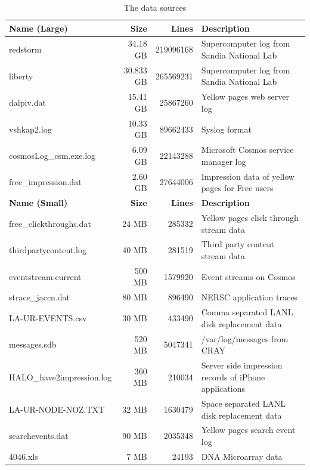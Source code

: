 \begin{table}[t]
\centering
\caption{The data sources}\label{tab:sources}
\begin{tabular}{|l|r|r|l|} \hline
{\bf Name (Large)} & {\bf Size} & {\bf Lines} & {\bf Description} \\ \hline
redstorm & 34.18 GB & 219096168 & Supercomputer log from Sandia National Lab	\\ \hline
liberty & 30.833 GB & 265569231 &	Supercomputer log from Sandia National Lab\\ \hline
dalpiv.dat & 15.41 GB & 25867260 &	Yellow pages web server log \\ \hline
vshkap2.log & 10.33 GB & 89662433	& Syslog format \\ \hline
cosmosLog\_csm.exe.log & 6.09 GB & 22143288 & Microsoft Cosmos service manager log\\ \hline
free\_impression.dat & 2.60 GB & 27644006 & Impression data of yellow pages for Free users\\ \hline \hline
{\bf Name (Small)} & {\bf Size} & {\bf Lines} & {\bf Description} \\ \hline
free\_clickthroughs.dat & 24 MB & 285332 & Yellow pages click through stream data \\ \hline
thirdpartycontent.log & 40 MB & 281519 &	Third party content stream data \\ \hline
eventstream.current & 500 MB & 1579920 &	Event streams on Cosmos \\ \hline
strace\_jaccn.dat & 80 MB & 896490 & NERSC application traces \\ \hline
LA-UR-EVENTS.csv & 30 MB &  433490 & Comma separated LANL disk replacement data\\ \hline
messages.sdb & 520 MB & 5047341 &	/var/log/messages from CRAY\\ \hline
HALO\_have2impression.log & 360 MB &  210034 & Server side impression records of iPhone applications\\ \hline
LA-UR-NODE-NOZ.TXT & 32 MB &  1630479 & Space separated LANL disk replacement data\\ \hline
searchevents.dat & 90 MB & 2035348 & Yellow pages search event log \\ \hline
4046.xls & 7 MB & 24193 & DNA Microarray data\\ \hline
\end{tabular}
\end{table}

